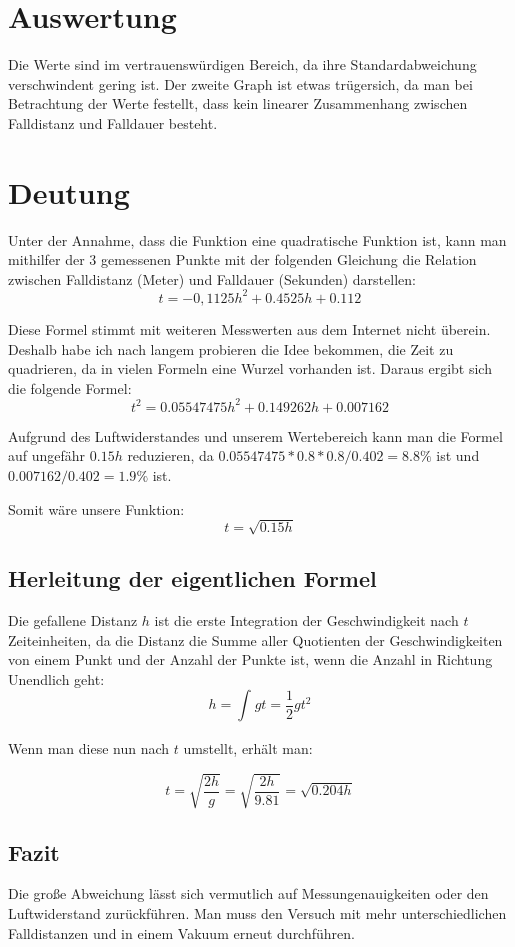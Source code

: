 \documentclass[8pt, letterpaper]{article}
\begin{document}

\section{Auswertung}
Die Werte sind im vertrauenswürdigen Bereich, da ihre Standardabweichung verschwindent gering ist.
Der zweite Graph ist etwas trügersich, da man bei Betrachtung der Werte festellt, dass kein linearer Zusammenhang zwischen Falldistanz und Falldauer besteht.

\section{Deutung}
Unter der Annahme, dass die Funktion eine quadratische Funktion ist, kann man mithilfer der 3 gemessenen Punkte mit der folgenden Gleichung die Relation zwischen Falldistanz (Meter) und Falldauer (Sekunden) darstellen:
\[ t = -0,1125h^{2} + 0.4525h + 0.112 \]

Diese Formel stimmt mit weiteren Messwerten aus dem Internet nicht überein. Deshalb habe ich nach langem probieren die Idee bekommen, die Zeit zu quadrieren, da in vielen Formeln eine Wurzel vorhanden ist. Daraus ergibt sich die folgende Formel:
\[ t^{2} = 0.05547475h^{2} + 0.149262h + 0.007162 \]

Aufgrund des Luftwiderstandes und unserem Wertebereich kann man die Formel auf ungefähr $0.15h$ reduzieren, da $0.05547475 * 0.8 * 0.8 / 0.402 = 8.8\%$ ist und $0.007162 / 0.402 = 1.9\%$ ist.

Somit wäre unsere Funktion:
\[ t = \sqrt{0.15h} \]

\subsection{Herleitung der eigentlichen Formel}
Die gefallene Distanz $h$ ist die erste Integration der Geschwindigkeit nach $t$ Zeiteinheiten, da die Distanz die Summe aller Quotienten der Geschwindigkeiten von einem Punkt und der Anzahl der Punkte ist, wenn die Anzahl in Richtung Unendlich geht:
\[ h = \int_{}^{}gt=\frac{1}{2}gt^{2} \]

Wenn man diese nun nach $t$ umstellt, erhält man:

\[ t = \sqrt{\frac{2h}{g}} = \sqrt{\frac{2h}{9.81}} = \sqrt{0.204h} \]

\subsection{Fazit}
Die große Abweichung lässt sich vermutlich auf Messungenauigkeiten oder den Luftwiderstand zurückführen. Man muss den Versuch mit mehr unterschiedlichen Falldistanzen und in einem Vakuum erneut durchführen.

% 
\end{document}
